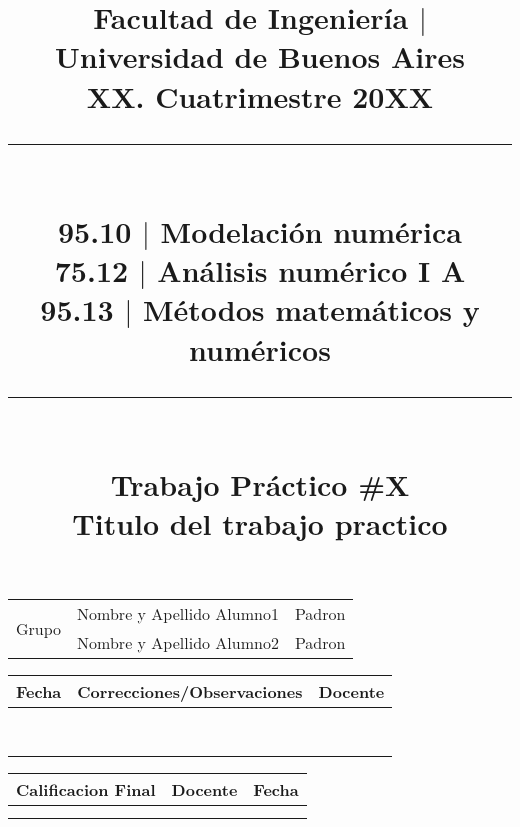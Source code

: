 \documentclass[a4paper,12pt]{article}
\title{
	\vspace{-3cm}
		{\small Facultad de Ingeniería $\vert$ Universidad de Buenos Aires} \\
		{\small XX. Cuatrimestre 20XX} \\
	\rule{400pt}{3pt}\\
		{\Large \textbf{95.10 $\vert$ Modelación numérica} }\\ \vspace{-0.3cm}
		{\large \textbf{75.12 $\vert$ Análisis numérico I A} }\\ \vspace{-0.3cm}
		{\large \textbf{95.13 $\vert$ Métodos matemáticos y numéricos} }
	\vspace{0.2cm}
	\rule{400pt}{3pt}\\
		{\Large \textbf{ Trabajo Práctico \#X} } \\ \vspace{0.5cm}
		{\Large \textbf{Titulo del trabajo practico}}
	\vspace{-2cm}
	\date{}
}
\begin{document}
\maketitle


\setlength{\arrayrulewidth}{0.5mm}
\setlength{\tabcolsep}{31pt}
\renewcommand{\arraystretch}{1.5}

\begin{center}
\begin{tabular}{ |c|c|c| } 
	\hline
	\multirow{2}{3em}{Grupo \centering{Nº}} & Nombre y Apellido Alumno1 & Padron \\ 
	\cline{2 - 3}
	
	& Nombre y Apellido Alumno2 & Padron \\ 
	\hline
\end{tabular}
\end{center}


\setlength{\arrayrulewidth}{0.5mm}
\setlength{\tabcolsep}{27pt}
\renewcommand{\arraystretch}{1.5}

\begin{center}
\begin{tabular}{ |c|c|c| } 
	\hline
	\textbf{Fecha} & \textbf{Correcciones/Observaciones} & \textbf{Docente} \\ 
	\hline
	& &  \\
	
	& &  \\
	
	& &  \\
	
	& &  \\
	
	& &  \\
	
	& &  \\
	
	& &  \\
	
	& &  \\
	\hline
\end{tabular}
\end{center}


\setlength{\tabcolsep}{37.5pt}
\renewcommand{\arraystretch}{1.5}

\begin{center}
\begin{tabular}{ |c|c|c| } 
	\hline
	\textbf{Calificacion Final} & \textbf{Docente} & \textbf{Fecha} \\ 
	\hline
	
	& &  \\
	
	& &  \\
	
	\hline
\end{tabular}
\end{center}
\end{document}
